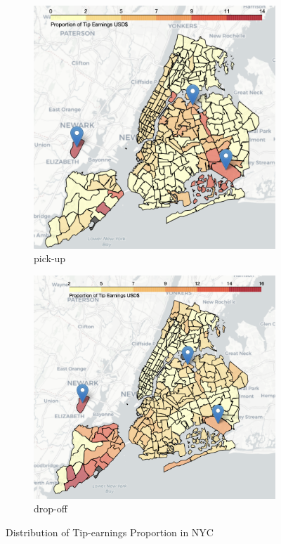 \documentclass[11pt]{article}
\begin{document}
\begin{figure}[h]
    \centering
    \begin{subfigure}[t]{0.4\textwidth}
        \centering
        \includegraphics[width=.9\textwidth]{plots/tip_prop_pick.png}
        \caption{pick-up}
        \label{fig:pick-up}
    \end{subfigure}
    \begin{subfigure}[t]{0.4\textwidth}
        \centering
        \includegraphics[width=1\textwidth]{plots/tip_prop_drop.png}
        \caption{drop-off}
        \label{fig:pick-up}
    \end{subfigure}
    \caption{Distribution of Tip-earnings Proportion in NYC}
\end{figure}
\end{document}
